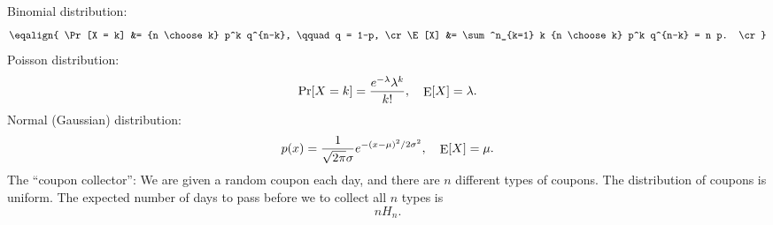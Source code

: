 Binomial distribution:
$$
\eqalign{
\Pr[X = k] &= {n \choose k} p^k q^{n-k}, \qquad q = 1-p, \cr
\E[X] &= \sum^n_{k=1} k {n \choose k} p^k q^{n-k} = n p. \cr
}
$$
Poisson distribution:
$$
\mathop{\rm Pr}\nolimits[X = k] = {e^{-\lambda} \lambda^k \over k!}, \quad  \mathop{\rm E}\nolimits[X] = \lambda.
$$
Normal (Gaussian) distribution:
$$
p(x) = {1 \over \sqrt{2 \pi} \sigma} e^{-(x-\mu)^2/2\sigma^2}, \quad \mathop{\rm E}\nolimits[X] = \mu.
$$
The ``coupon collector'':
We are given a random coupon each day,
and there are $n$ different types of coupons.
The distribution of coupons is uniform.
The expected number of days to pass before we to collect all $n$ types is
$$n H_n.$$
